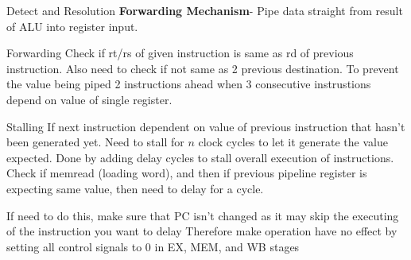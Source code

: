 \documentclass{article}
\begin{document}
		Detect and Resolution
			\textbf{Forwarding Mechanism}- Pipe data straight from result of ALU into register input.

			Forwarding
				Check if rt/rs of given instruction is same as rd of previous instruction.
				Also need to check if not same as 2 previous destination. To prevent the value being piped 2 instructions ahead when 3 consecutive instrustions depend on value of single register.

			Stalling
				If next instruction dependent on value of previous instruction that hasn't been generated yet. 
				Need to stall for $n$ clock cycles to let it generate the value expected. 
				Done by adding delay cycles to stall overall execution of instructions.
				Check if memread (loading word), and then if previous pipeline register is expecting same value, then need to delay for a cycle.

				If need to do this, make sure that PC isn't changed as it may skip the executing of the instruction you want to delay
				Therefore make operation have no effect by setting all control signals to 0 in EX, MEM, and WB stages

				


			
\end{document}
